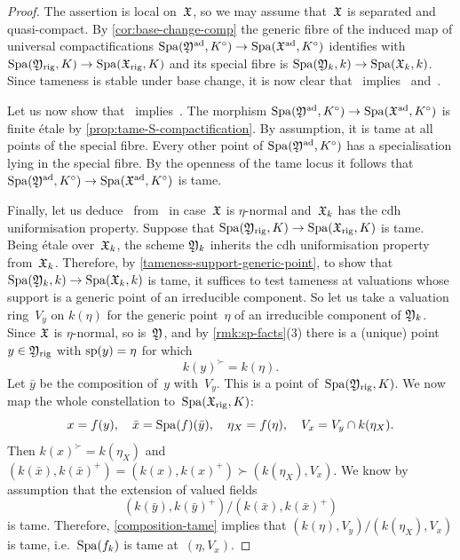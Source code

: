 \begin{proof}
The assertion is local on~${\mathfrak{X}}$, so we may assume that~${\mathfrak{X}}$ is separated and quasi-compact.
By \cref{cor:base-change-comp} the generic fibre of the induced map of universal compactifications $\operatorname{Spa}({\mathfrak{Y}}^{\rm ad}, K^\circ) \to \operatorname{Spa}({\mathfrak{X}}^{\rm ad}, K^\circ)$ identifies with $\operatorname{Spa}({\mathfrak{Y}}_{\rm rig}, K) \to \operatorname{Spa}({\mathfrak{X}}_{\rm rig}, K)$ and its special fibre is $\operatorname{Spa}({\mathfrak{Y}}_k,k) \to \operatorname{Spa}({\mathfrak{X}}_k,k)$.
Since tameness is stable under base change, it is now clear that~ implies~ and~.

Let us now show that~ implies~.
The morphism $\operatorname{Spa}({\mathfrak{Y}}^{\rm ad},K^\circ) \to \operatorname{Spa}({\mathfrak{X}}^{\rm ad},K^\circ)$ is finite étale by \cref{prop:tame-S-compactification}.
By assumption, it is tame at all points of the special fibre.
Every other point of $\operatorname{Spa}({\mathfrak{Y}}^{\rm ad},K^\circ)$ has a specialisation lying in the special fibre.
By the openness of the tame locus \cite[Corollary~4.4]{Hubner2021:AdicTameSite} it follows that $\operatorname{Spa}({\mathfrak{Y}}^{\rm ad}, K^\circ) \to \operatorname{Spa}({\mathfrak{X}}^{\rm ad}, K^\circ)$ is tame.

Finally, let us deduce~ from~ in case~${\mathfrak{X}}$ is $\eta$-normal and~${\mathfrak{X}}_k$ has the cdh uniformisation property.
Suppose that $\operatorname{Spa}({\mathfrak{Y}}_{\rm rig}, K) \to \operatorname{Spa}({\mathfrak{X}}_{\rm rig}, K)$ is tame.
Being étale over~${\mathfrak{X}}_k$, the scheme ${\mathfrak{Y}}_k$ inherits the cdh uniformisation property from~${\mathfrak{X}}_k$. 
Therefore, by \cref{tameness-support-generic-point}, to show that $\operatorname{Spa}({\mathfrak{Y}}_k, k) \to \operatorname{Spa}({\mathfrak{X}}_k, k)$ is tame, it suffices to test tameness at valuations whose support is a generic point of an irreducible component.
So let us take a valuation ring~$V_y$ on $k(\eta)$ for the generic point~$\eta$ of an irreducible component of ${\mathfrak{Y}}_k$.
Since ${\mathfrak{X}}$ is $\eta$-normal, so is~${\mathfrak{Y}}$, and by \cref{rmk:sp-facts}(3) there is a (unique) point $y \in {\mathfrak{Y}}_{\rm rig}$ with $\operatorname{sp}(y) = \eta$ for which
\[
k(y)^\succ = k(\eta).
\]
Let $\bar{y}$ be the composition of~$y$ with~$V_y$.
This is a point of~$\operatorname{Spa}({\mathfrak{Y}}_{\rm rig},K)$.
We now map the whole constellation to~$\operatorname{Spa}({\mathfrak{X}}_{\rm rig},K)$:
\[
x = f(y),    \quad   \bar{x} = \operatorname{Spa}(f)(\bar{y}),   \quad   \eta_X = f(\eta),   \quad V_x = V_y \cap k(\eta_X).
\]
Then $k(x)^\succ = k(\eta_X)$ and $(k(\bar{x}),k(\bar{x})^+) = (k(x),k(x)^+) \succ (k(\eta_X),V_x)$.
We know by assumption that the extension of valued fields
\[
(k(\bar{y}),k(\bar{y})^+)/(k(\bar{x}),k(\bar{x})^+)
\]
is tame.
Therefore, \cref{composition-tame} implies that $(k(\eta),V_y)/(k(\eta_X),V_x)$
is tame, i.e.~$\operatorname{Spa}(f_k)$ is tame at~$(\eta,V_x)$.
\end{proof}


